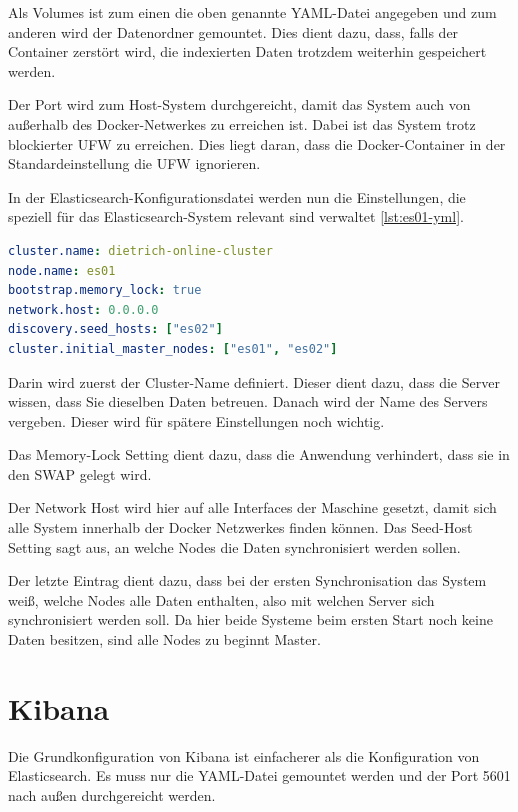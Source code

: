 Als Volumes ist zum einen die oben genannte YAML-Datei angegeben und zum anderen wird der Datenordner gemountet. Dies dient dazu, dass, falls der Container zerstört wird, die indexierten Daten trotzdem weiterhin gespeichert werden.

Der Port wird zum Host-System durchgereicht, damit das System auch von außerhalb des Docker-Netwerkes zu erreichen ist. Dabei ist das System trotz blockierter UFW zu erreichen. Dies liegt daran, dass die Docker-Container in der Standardeinstellung die UFW ignorieren.

In der Elasticsearch-Konfigurationsdatei werden nun die Einstellungen, die speziell für das Elasticsearch-System relevant sind verwaltet \ref{lst:es01-yml}. 

\begin{lstlisting}[language=YAML, frame=single, label={lst:es01-yml}] 
cluster.name: dietrich-online-cluster
node.name: es01
bootstrap.memory_lock: true
network.host: 0.0.0.0
discovery.seed_hosts: ["es02"]
cluster.initial_master_nodes: ["es01", "es02"]
\end{lstlisting}

Darin wird zuerst der Cluster-Name definiert. Dieser dient dazu, dass die Server wissen, dass Sie dieselben Daten betreuen. 
Danach wird der Name des Servers vergeben. Dieser wird für spätere Einstellungen noch wichtig.

Das Memory-Lock Setting dient dazu, dass die Anwendung verhindert, dass sie in den SWAP gelegt wird.

Der Network Host wird hier auf alle Interfaces der Maschine gesetzt, damit sich alle System innerhalb der Docker Netzwerkes finden können.
Das Seed-Host Setting sagt aus, an welche Nodes die Daten synchronisiert werden sollen.

Der letzte Eintrag dient dazu, dass bei der ersten Synchronisation das System weiß, welche Nodes alle Daten enthalten, also mit welchen Server sich synchronisiert werden soll. Da hier beide Systeme beim ersten Start noch keine Daten besitzen, sind alle Nodes zu beginnt Master. 


\section{Kibana}

Die Grundkonfiguration von Kibana ist einfacherer als die Konfiguration von Elasticsearch. Es muss nur die YAML-Datei gemountet werden und der Port 5601 nach außen durchgereicht werden.

